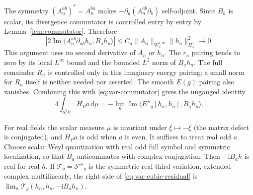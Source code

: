 \documentclass[11pt,a4paper]{article}
\numberwithin{equation}{section}
\newcommand{\dd}{\mathrm d}
\newcommand{\ip}[2]{\langle #1,#2\rangle}
\newcommand{\ii}{\mathrm{i}}
\renewcommand{\Im}{\operatorname{Im}}
\theoremstyle{definition}
\begin{document}
The symmetry $(A_n^{ab})^*=A_n^{ba}$ makes
$-\partial_a(A_n^{ab}\partial_b)$ self-adjoint.
Since $B_a$ is scalar, its divergence commutator is controlled entry
by entry by Lemma~\ref{lem:commutator}. Therefore
\begin{equation*}
\left|2\Im\ip{A_n^{ab}\partial_{ab}h_n}{B_ah_n}\right|
\leq C_a\|A_n\|_{W^{1,\infty}_x}\|h_n\|_{H^1_x}^2\longrightarrow0.
\end{equation*}
This argument uses no second derivative of $A_n$ or $h_n$.
The $r_n$ pairing tends to zero by its local $L^\infty$ bound and
the bounded $L^2$ norm of $B_ah_n$. The full remainder $R_n$ is
controlled only in this imaginary energy pairing; a small norm for
$R_n$ itself is neither needed nor asserted.
The smooth $E(g)$ pairing also vanishes. Combining this with
\eqref{eq:var-commutator} gives the ungauged identity
\begin{equation}\label{eq:var-cubic-residual}
4\int_{S_r^*U} H_Pa\,\dd\mu
=-\lim_n\Im\ip{E''_g[h_n,h_n]}{B_ah_n}.
\end{equation}

For real fields the scalar measure $\mu$ is invariant under
$\xi\mapsto-\xi$ (the matrix defect is conjugated), and
$H_Pa$ is odd when $a$ is even. It suffices to treat real odd $a$.
Choose scalar Weyl quantization with real odd full symbol and symmetric
localization, so that $B_a$ anticommutes with complex conjugation.
Then $-\ii B_ah$ is real for real $h$. If
$\mathcal T_g=\mathcal S'''_g$ is the symmetric real third variation,
extended complex multilinearly, the right side of
\eqref{eq:var-cubic-residual} is
$\lim_n\mathcal T_g(h_n,h_n,-\ii B_ah_n)$.
\end{document}
